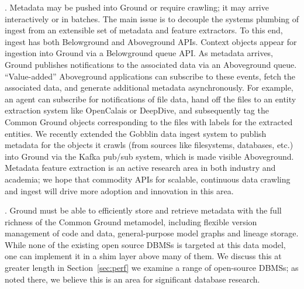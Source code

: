 \documentclass{sig-alternate}
\begin{document}
.  Metadata may be pushed into Ground or require crawling; it may arrive interactively or in batches. 
The main issue is to decouple the systems plumbing of ingest from an extensible set of metadata and feature extractors.
To this end, ingest has both Belowground and Aboveground APIs. 
Context objects appear for ingestion into Ground via a Belowground queue API. As metadata arrives, Ground publishes notifications to the associated data via an Aboveground queue. ``Value-added'' Aboveground applications can subscribe to these events, fetch the associated data, and generate additional metadata asynchronously. For example, an agent can subscribe for notifications of file data, hand off the files to an entity extraction system like OpenCalais or DeepDive, and subsequently tag the Common Ground objects corresponding to the files with labels for the extracted entities.
We recently extended the Gobblin data ingest system to publish metadata for the objects it crawls (from 
sources like filesystems, databases, etc.) into Ground via the Kafka pub/sub system, which is made visible Aboveground. 
Metadata feature extraction is an active research area in both industry and academia; we hope that commodity APIs for scalable, continuous data crawling and ingest will drive more adoption and innovation in this area. 

.  Ground must be able to efficiently store and retrieve metadata with the full richness of the Common Ground metamodel, including flexible version management of code and data, general-purpose model graphs and lineage storage. 
While none of the existing open source DBMSs is targeted at this data model, one can implement it in a shim layer above many of them. We discuss this at greater length in Section~\ref{sec:perf} we examine a range of open-source DBMSs; as noted there, we believe this is an area for significant database research.
\end{document}
